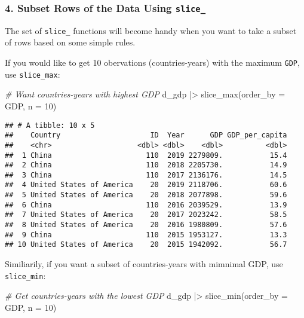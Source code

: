 \documentclass[
]{article}
\newenvironment{Shaded}{\begin{snugshade}}{\end{snugshade}}
\newcommand{\AttributeTok}[1]{\textcolor[rgb]{0.77,0.63,0.00}{#1}}
\newcommand{\CommentTok}[1]{\textcolor[rgb]{0.56,0.35,0.01}{\textit{#1}}}
\newcommand{\DecValTok}[1]{\textcolor[rgb]{0.00,0.00,0.81}{#1}}
\newcommand{\FunctionTok}[1]{\textcolor[rgb]{0.00,0.00,0.00}{#1}}
\newcommand{\NormalTok}[1]{#1}
\newcommand{\SpecialCharTok}[1]{\textcolor[rgb]{0.00,0.00,0.00}{#1}}
\begin{document}
\hypertarget{subset-rows-of-the-data-using-slice_}{%
\subsubsection{\texorpdfstring{4. Subset Rows of the Data Using
\texttt{slice\_}}{4. Subset Rows of the Data Using slice\_}}\label{subset-rows-of-the-data-using-slice_}}

The set of \texttt{slice\_} functions will become handy when you want to
take a subset of rows based on some simple rules.

If you would like to get 10 obervations (countries-years) with the
maximum \texttt{GDP}, use \texttt{slice\_max}:

\begin{Shaded}
\begin{Highlighting}[]
\CommentTok{\# Want countries{-}years with highest GDP}
\NormalTok{d\_gdp }\SpecialCharTok{|\textgreater{}} \FunctionTok{slice\_max}\NormalTok{(}\AttributeTok{order\_by =}\NormalTok{ GDP, }\AttributeTok{n =} \DecValTok{10}\NormalTok{)}
\end{Highlighting}
\end{Shaded}

\begin{verbatim}
## # A tibble: 10 x 5
##    Country                     ID  Year      GDP GDP_per_capita
##    <chr>                    <dbl> <dbl>    <dbl>          <dbl>
##  1 China                      110  2019 2279809.           15.4
##  2 China                      110  2018 2205730.           14.9
##  3 China                      110  2017 2136176.           14.5
##  4 United States of America    20  2019 2118706.           60.6
##  5 United States of America    20  2018 2077898.           59.6
##  6 China                      110  2016 2039529.           13.9
##  7 United States of America    20  2017 2023242.           58.5
##  8 United States of America    20  2016 1980809.           57.6
##  9 China                      110  2015 1953127.           13.3
## 10 United States of America    20  2015 1942092.           56.7
\end{verbatim}

Similiarily, if you want a subset of countries-years with mimnimal GDP,
use \texttt{slice\_min}:

\begin{Shaded}
\begin{Highlighting}[]
\CommentTok{\# Get countries{-}years with the lowest GDP}
\NormalTok{d\_gdp }\SpecialCharTok{|\textgreater{}} \FunctionTok{slice\_min}\NormalTok{(}\AttributeTok{order\_by =}\NormalTok{ GDP, }\AttributeTok{n =} \DecValTok{10}\NormalTok{)}
\end{Highlighting}
\end{Shaded}
\end{document}
